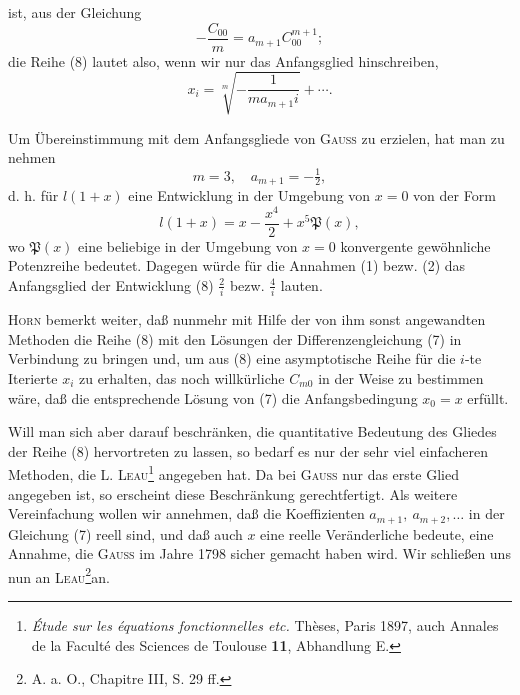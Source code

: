\clearpage{}
\begingroup\small
\makeatletter\tagsleft@true\let\veqno\@@leqno\makeatother
\noindent ist, aus der Gleichung
\[
-\frac{C_{00}}m=a_{m+1}C_{00}^{m+1};
\]
\noindent die Reihe (8) lautet also, wenn wir nur das Anfangsglied hinschreiben,
\begin{equation}
x_i=\sqrt[m]{-\frac1{ma_{m+1}i}}+\cdots.\tag*{(9)}
\end{equation}

Um Übereinstimmung mit dem Anfangsgliede von \textsc{Gauss} zu erzielen, hat man zu nehmen
\begin{equation}
m=3,\quad a_{m+1}=-\tfrac12,\tag*{(10)}
\end{equation}
\noindent d. h. für \(l(1+x)\) eine Entwicklung in der Umgebung von \(x=0\) von der Form
\begin{equation}
l(1+x)=x-\frac{x^4}{2}+x^5\mathfrak{P}(x),\tag*{(11)}
\end{equation}
\noindent wo \(\mathfrak{P}(x)\) eine beliebige in der Umgebung von \(x=0\) konvergente gewöhnliche Potenzreihe bedeutet. Dagegen würde für die Annahmen (1) bezw. (2) das Anfangsglied der Entwicklung (8) \(\frac2i\) bezw. \(\frac4i\) lauten.

\textsc{Horn} bemerkt weiter, daß nunmehr mit Hilfe der von ihm sonst angewandten Methoden die Reihe (8) mit den Lösungen der Differenzengleichung (7) in Verbindung zu bringen und, um aus (8) eine asymptotische Reihe für die \(i\)-te Iterierte \(x_i\) zu erhalten, das noch willkürliche \(C_{m0}\) in der Weise zu bestimmen wäre, daß die entsprechende Lösung von (7) die Anfangsbedingung \(x_0=x\) erfüllt.

Will man sich aber darauf beschränken, die quantitative Bedeutung des  Gliedes der Reihe (8) hervortreten zu lassen, so bedarf es nur der sehr viel einfacheren Methoden, die L. \textsc{Leau}\footnote{\textit{Étude sur les équations fonctionnelles etc.} Thèses, Paris 1897, auch Annales de la Faculté des Sciences de Toulouse \textbf{11}, Abhandlung E.} angegeben hat. Da bei \textsc{Gauss} nur das erste Glied angegeben ist, so erscheint diese Beschränkung gerechtfertigt. Als weitere Vereinfachung wollen wir annehmen, daß die Koeffizienten \(a_{m+1},\ a_{m+2},\ldots\) in der Gleichung (7) reell sind, und daß auch \(x\) eine reelle Veränderliche bedeute, eine Annahme, die \textsc{Gauss} im Jahre 1798 sicher gemacht haben wird. Wir schließen uns nun an \textsc{Leau}\begingroup\renewcommand{\thefootnote}{**)}\footnote{A. a. O., Chapitre III, S. 29 ff.}\endgroup an.

